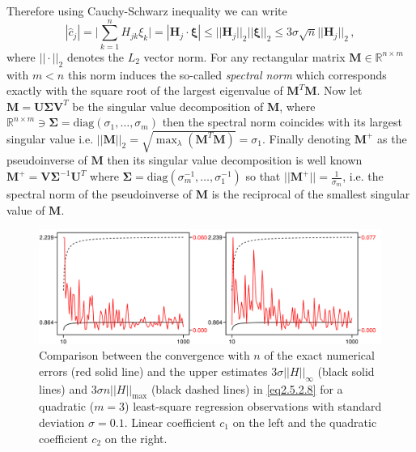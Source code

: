 \documentclass[../main.tex]{subfiles}
\begin{document}
Therefore using Cauchy-Schwarz inequality we can write
\begin{equation}\label{eq2.5.2.9}
        |\hat{c}_{j}| = \Bigg|\sum_{k=1}^{n}H_{jk}\xi_{k}\Bigg| = |\boldsymbol{H}_{j}\cdot \boldsymbol{\xi}|\leq||\boldsymbol{H}_{j}||_{2}||\boldsymbol{\xi}||_{2}\leq3\sigma\sqrt{n}||\boldsymbol{H}_{j}||_{2}\,,
\end{equation}
where $||\cdot||_{2}$ denotes the $L_{2}$ vector norm.
For any rectangular matrix $\boldsymbol{M}\in \mathbb{R}^{n\times m}$ with $m<n$ this norm induces the so-called \textit{spectral norm} which corresponds exactly with the square root of the largest eigenvalue of $\boldsymbol{M}^{T}\boldsymbol{M}$.
Now let $\boldsymbol{M}=\boldsymbol{U}\boldsymbol{\Sigma}\boldsymbol{V}^{T}$ be the singular value decomposition of $\boldsymbol{M}$, where $\mathbb{R}^{n\times m}\ni\boldsymbol{\Sigma} = \text{diag}(\sigma_{1},\dots,\sigma_{m})$ then the spectral norm coincides with its largest singular value i.e. $||\boldsymbol{M}||_{2}=\sqrt{\max_{\lambda}(\boldsymbol{M}^{T}\boldsymbol{M})} = \sigma_{1}$.
Finally denoting $\boldsymbol{M}^{+}$ as the pseudoinverse of $\boldsymbol{M}$ then its singular value decomposition is well known $\boldsymbol{M}^{+} = \boldsymbol{V}\boldsymbol{\Sigma}^{-1}\boldsymbol{U}^{T}$ where $\boldsymbol{\Sigma} = \text{diag}(\sigma_{m}^{-1},\dots,\sigma_{1}^{-1})$ so that $||\boldsymbol{M}^{+}||=\frac{1}{\sigma_{m}}$, i.e. the spectral norm of the pseudoinverse of $\boldsymbol{M}$ is the reciprocal of the smallest singular value of $\boldsymbol{M}$.
\begin{figure}[H]
    \centering 
    \includegraphics[keepaspectratio, width=\textwidth]{../figures/fig2.5.2.2.png}
    \caption{Comparison between the convergence with $n$ of the exact numerical errors (red solid line) and the upper estimates $3\sigma||H||_{\infty}$ (black solid lines) and $3\sigma n ||H||_{\text{max}}$ (black dashed lines) in \eqref{eq2.5.2.8} for a quadratic ($m=3$) least-square regression observations with standard deviation $\sigma=0.1$. 
    Linear coefficient $c_{1}$ on the left and the quadratic coefficient $c_{2}$ on the right.}
    \label{fig2.5.2.2}
\end{figure}
\end{document}
